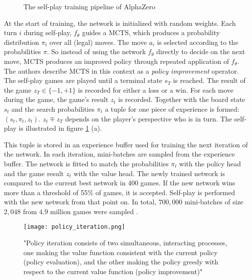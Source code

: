 \begin{figure}[!h]
    \centering
    \caption{The self-play training pipeline of AlphaZero \cite[p. 5]{silver_mastering_2017}}
    \label{alpha_zero_training}
\end{figure}

At the start of training, the network is initialized with random weights. Each turn $i$ during self-play, $f_{\theta}$ guides a MCTS, which produces a probability distribution $\pi_t$ over all (legal) moves. The move $a_i$ is selected according to the probabilities $\pi$. So instead of using the network $f_{\theta}$ directly to decide on the next move, MCTS produces an improved policy through repeated application of $f_{\theta}$. The authors describe MCTS in this context as a \textit{policy improvement} operator. The self-play games are played until a terminal state $s_T$ is reached. The result of the game $z_T \in \{-1, +1\}$ is recorded for either a loss or a win. For each move during the game, the game's result $z_t$ is recorded. Together with the board state $s_t$ and the search probabilities $\pi_t$ a tuple for one piece of experience is formed: $(s_t, \pi_t, z_t)$. $z_t \mp z_T $ depends on the player's perspective who is in turn. The self-play is illustrated in figure \ref{alpha_zero_training} (a).

This tuple is stored in an experience buffer used for training the next iteration of the network. In each iteration, mini-batches are sampled from the experience buffer. The network is fitted to match the probabilities $\pi_t$ with the policy head and the game result $z_t$ with the value head. The newly trained network is compared to the current best network in 400 games. If the new network wins more than a threshold of 55\% of games, it is accepted. Self-play is performed with the new network from that point on. In total, $700,000$ mini-batches of size $2,048$ from $4.9$ million games were sampled \cite[p. 6]{silver_mastering_2017}.

\begin{figure}
    \centering
    \texttt{[image: policy\_iteration.png]}
    \caption{"Policy iteration consists of two simultaneous, interacting processes, one making the value function consistent with the current policy (policy evaluation), and the other making the policy greedy with respect to the current value function (policy improvement)" \cite[86]{sutton_reinforcement_2018}}
    \label{policy_iteration}
\end{figure}

